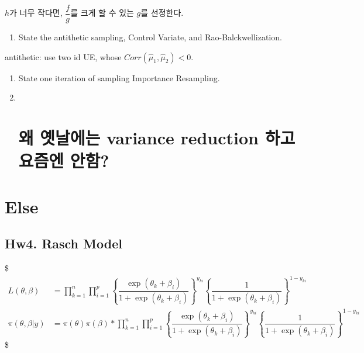 \documentclass[
]{book}
\providecommand{\tightlist}{%
  \setlength{\itemsep}{0pt}\setlength{\parskip}{0pt}}
\begin{document}
\(h\)가 너무 작다면, \(\dfrac{f}{g}\)를 크게 할 수 있는 \(g\)를 선정한다.

\begin{enumerate}
\def\labelenumi{\arabic{enumi}.}
\setcounter{enumi}{1}
\tightlist
\item
  State the antithetic sampling, Control Variate, and Rao-Balckwellization.
\end{enumerate}

antithetic: use two id UE, whose \(Corr(\hat \mu_1 , \hat \mu_2)<0\).

\begin{enumerate}
\def\labelenumi{\arabic{enumi}.}
\setcounter{enumi}{2}
\item
  State one iteration of sampling Importance Resampling.
\item ~
  \hypertarget{uxc65c-uxc61buxb0a0uxc5d0uxb294-variance-reduction-uxd558uxace0-uxc694uxc998uxc5d4-uxc548uxd568}{%
  \section{왜 옛날에는 variance reduction 하고 요즘엔 안함?}\label{uxc65c-uxc61buxb0a0uxc5d0uxb294-variance-reduction-uxd558uxace0-uxc694uxc998uxc5d4-uxc548uxd568}}
\end{enumerate}

\hypertarget{else}{%
\section{Else}\label{else}}

\hypertarget{hw4.-rasch-model}{%
\subsection{Hw4. Rasch Model}\label{hw4.-rasch-model}}

\$
\begin{align}

L(\theta, \beta) &= \prod_{k=1}^n \prod_{i=1}^p \left\{ \dfrac{\exp(\theta_k + \beta_i)}{1 + \exp(\theta_k + \beta_i)}\right\}^{y_{ki}} \left\{ \dfrac{1}{1 + \exp(\theta_k + \beta_i)}\right\}^{1-y_{ki}} \\



\pi (\theta, \beta \vert y) &= \pi(\theta) \pi(\beta) \ast \prod_{k=1}^n \prod_{i=1}^p \left\{ \dfrac{\exp(\theta_k + \beta_i)}{1 + \exp(\theta_k + \beta_i)}\right\}^{y_{ki}} \left\{ \dfrac{1}{1 + \exp(\theta_k + \beta_i)}\right\}^{1-y_{ki}}


\end{align}
\$
\end{document}
